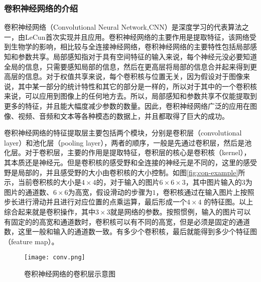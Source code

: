 \subsubsection{卷积神经网络的介绍}
卷积神经网络（Convolutional Neural Network,CNN）是深度学习的代表算法之一，由LeCun首次实现并且应用。卷积神经网络的主要作用是提取特征，该网络受到生物学的影响，相比较与全连接神经网络，卷积神经网络的主要特性包括局部感知和参数共享。局部感知指对于具有空间特征的输入来说，每个神经元没必要知道全局的信息，只需要感知局部的信息，然后在更高层将局部的信息合并起来得到更高层的信息。对于权值共享来说，每个卷积核与位置无关，因为假设对于图像来说，其中某一部分的统计特性和其它的部分是一样的，所以对于其中的一个卷积核来说，可以应用到图像上的任何地方去。所以，局部感知和参数共享不仅能提取到更多的特征，并且能大幅度减少参数的数量。因此，卷积神经网络广泛的应用在图像、视频、音频和文本等各种模态的数据上，并且都取得了巨大的成功。

卷积神经网络的特征提取层主要包括两个模块，分别是卷积层（convolutional layer）和池化层（pooling layer），两者的顺序，一般是先通过卷积层，然后是池化层。对于卷积层，主要的作用是提取特征，卷积层的核心是卷积核（kernel），其本质还是神经元。但是卷积核的感受野和全连接的神经元是不同的，这里的感受野是局部的，并且感受野的大小由卷积核的大小控制。如图\ref{fig:con-example}所示，当前卷积核的大小是$4 \times 4$的，对于输入的图片$6 \times 6 \times 3$，其中图片输入的3为图片的通道数、$6 \times 6$为高宽，假设滑动的步骤为$1$，卷积核通过在输入图片上按照步长进行滑动并且进行对应位置的点乘运算，最后形成一个$4 \times 4$ 的特征图。以上综合起来就是卷积操作，其中$3 \times 3$就是网络的参数。按照惯例，输入的图片可以有固定的的高宽和通道数时，卷积核可以有不同的高宽，但是必须是固定的通道数，这里一般和输入的通道数一致。有多少个卷积核，最后就能得到多少个特征图（feature map）。
\begin{figure}[htpb]
	\centering
	\texttt{[image: conv.png]}
    \caption{卷积神经网络的卷积层示意图}
	\vspace*{-3.5mm}
	\label{fig:conv-example}
\end{figure}

